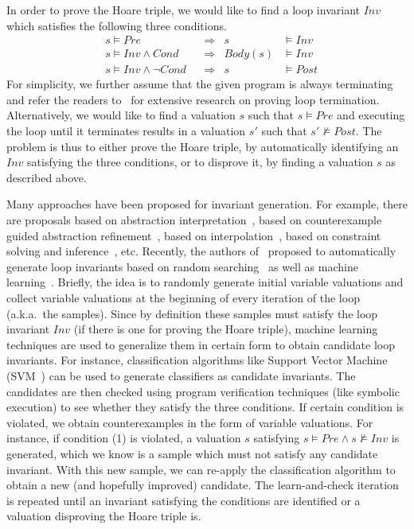 In order to prove the Hoare triple, we would like to find a loop invariant $Inv$ which satisfies the following three conditions.
\begin{align}
    &s \models Pre
        &&\Longrightarrow & s &\models Inv \label{inv:pre} \\
    &s \models Inv \wedge Cond
        &&\Longrightarrow & Body(s) &\models Inv \label{inv:loop} \\
    &s \models Inv \wedge \neg Cond
        &&\Longrightarrow & s &\models Post \label{inv:post}
\end{align}
For simplicity, we further assume that the given program is always terminating and refer the readers to~\cite{} for extensive research on proving loop termination.
Alternatively, we would like to find a valuation $s$ such that $s \models \mathit{Pre}$ and executing the loop until it terminates results in a valuation $s'$ such that $s' \not \models Post$.
The problem is thus to either prove the Hoare triple, by automatically identifying an $Inv$ satisfying the three conditions, or to disprove it, by finding a valuation $s$ as described above.

Many approaches have been proposed for invariant generation. For example, there are proposals based on abstraction interpretation~\cite{cite}, based on counterexample guided abstraction refinement~\cite{cite}, based on interpolation~\cite{cite}, based on constraint solving and inference~\cite{cite}, etc. Recently, the authors of~\cite{sharma2012interpolants,DBLP:conf/sas/0001GHAN13,sharma2014invariant} proposed to automatically generate loop invariants based on random searching~\cite{sharma2014invariant} as well as machine learning~\cite{sharma2012interpolants}. Briefly, the idea is to randomly generate initial variable valuations and collect variable valuations at the beginning of every iteration of the loop (a.k.a.~the samples). Since by definition these samples must satisfy the loop invariant $Inv$ (if there is one for proving the Hoare triple), machine learning techniques are used to generalize them in certain form to obtain candidate loop invariants. For instance, classification algorithms like Support Vector Machine (SVM~\cite{sharma2012interpolants,DBLP:conf/sas/0001GHAN13}) can be used to generate classifiers as candidate invariants. The candidates are then checked using program verification techniques (like symbolic execution) to see whether they satisfy the three conditions. If certain condition is violated, we obtain counterexamples in the form of variable valuations. For instance, if condition (1) is violated, a valuation $s$ satisfying $s \models Pre \land s \not \models Inv$ is generated, which we know is a sample which must not satisfy any candidate invariant. With this new sample, we can re-apply the classification algorithm to obtain a new (and hopefully improved) candidate. The learn-and-check iteration is repeated until an invariant satisfying the conditions are identified or a valuation disproving the Hoare triple is.

